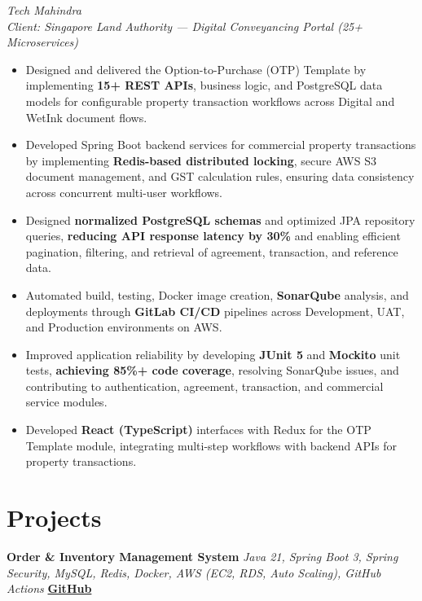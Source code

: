 \documentclass[10pt,a4paper]{article}
\begin{document}
\textit{Tech Mahindra}
\hfill\\\smallskip
\textit{Client: Singapore Land Authority --- Digital Conveyancing Portal (25+ Microservices)}
\begin{itemize}
\item Designed and delivered the Option-to-Purchase (OTP) Template by implementing \textbf{15+ REST APIs}, business logic, and PostgreSQL data models for configurable property transaction workflows across Digital and WetInk document flows.
\item Developed Spring Boot backend services for commercial property transactions by implementing \textbf{Redis-based distributed locking}, secure AWS S3 document management, and GST calculation rules, ensuring data consistency across concurrent multi-user workflows.
\item Designed \textbf{normalized PostgreSQL schemas} and optimized JPA repository queries, \textbf{reducing API response latency by 30\%} and enabling efficient pagination, filtering, and retrieval of agreement, transaction, and reference data.
\item Automated build, testing, Docker image creation, \textbf{SonarQube} analysis, and deployments through \textbf{GitLab CI/CD} pipelines across Development, UAT, and Production environments on AWS.
\item Improved application reliability by developing \textbf{JUnit 5} and \textbf{Mockito} unit tests, \textbf{achieving 85\%+ code coverage}, resolving SonarQube issues, and contributing to authentication, agreement, transaction, and commercial service modules.
\item Developed \textbf{React (TypeScript)} interfaces with Redux for the OTP Template module, integrating multi-step workflows with backend APIs for property transactions.
\end{itemize}
\section*{Projects}

\textbf{Order \& Inventory Management System} \;\textbar\;
\textit{Java 21, Spring Boot 3, Spring Security, MySQL, Redis, Docker, AWS (EC2, RDS, Auto Scaling), GitHub Actions} \;\textbar\;
\href{https://github.com/Prasanth-sakunala/Order-Inventory-Management-System}{\textbf{GitHub}}
\end{document}
